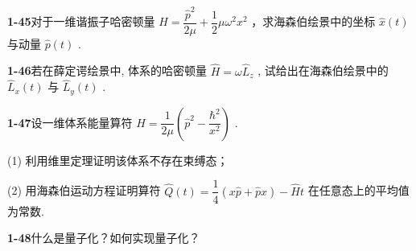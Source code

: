 \vfill

\newpage

\textbf{1-45}\quad 对于一维谐振子哈密顿量 $\displaystyle \hat{H} = \dfrac{\hat{p}^2}{2\mu} + \dfrac{1}{2}\mu \omega^2 x^2$ ，求海森伯绘景中的坐标 $\displaystyle \hat{x}(t)$ 与动量 $\displaystyle \hat{p}(t)$ .

\vfill

\newpage

\textbf{1-46}\quad 若在薛定谔绘景中, 体系的哈密顿量 $\displaystyle \hat{H} = \omega \hat{L}_z$ , 试给出在海森伯绘景中的 $\displaystyle \hat{L}_x(t)$ 与 $\displaystyle \hat{L}_y(t)$ .

\vfill

\newpage

\textbf{1-47}\quad 设一维体系能量算符 $\displaystyle \hat{H} = \dfrac{1}{2\mu}\left(\hat{p}^2 - \dfrac{\hbar^2}{x^2}\right)$ .

(1) 利用维里定理证明该体系不存在束缚态；

(2) 用海森伯运动方程证明算符 $\displaystyle \hat{Q}(t) = \dfrac{1}{4}(x\hat{p} + \hat{p}x) - \hat{H}t$ 在任意态上的平均值为常数.

\vfill

\newpage

\textbf{1-48}\quad 什么是量子化？如何实现量子化？

\vfill

\newpage

